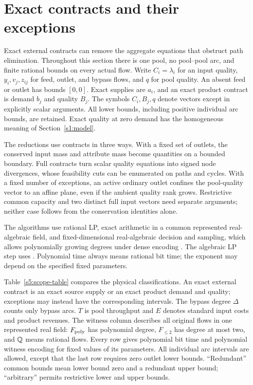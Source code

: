 \section{Exact contracts and their exceptions}\label{s5:contracts}

Exact external contracts can remove the aggregate equations that obstruct
path elimination. Throughout
this section there is one pool, no pool--pool arc, and finite rational
bounds on every actual flow. Write $C_i=\lambda_i$ for an input quality,
$y_i,v_j,z_{ij}$ for feed, outlet, and bypass flows, and $q$ for pool
quality. An absent feed or outlet has bounds $[0,0]$. Exact supplies are
$a_i$, and an exact product contract is demand $b_j$ and quality $B_j$.
The symbols $C_i,B_j,q$ denote vectors except in explicitly scalar
arguments. All lower bounds, including positive individual arc bounds,
are retained. Exact quality at zero demand has the homogeneous meaning
of Section~\ref{s1:model}.

The reductions use contracts in three ways. With a fixed set of outlets,
the conserved input mass and attribute mass become quantities on a
bounded boundary. Full contracts turn scalar quality equations into signed
node divergences, whose feasibility cuts can be enumerated on paths
and cycles. With a fixed number of exceptions, an active ordinary
outlet confines the pool-quality vector to an affine plane,
even if the ambient quality rank grows. Restrictive common capacity
and two distinct full input vectors need separate arguments;
neither case follows from the conservation identities alone.

The algorithms use rational LP, exact arithmetic in a common represented
real-algebraic field, and fixed-dimensional real-algebraic decision and
sampling, which allows polynomially growing degrees under dense
encoding \citep[Theorem~1.3.1 and Sections~3.1.3--3.2]
{basu1996-on-the-combinatorial-and-algebraic}. The algebraic LP step uses
\citet[Section~5, Remark~1]{s4:adler1994}. Polynomial time always
means rational bit time; the exponent may depend on the
specified fixed parameters.

Table~\ref{s5:scope-table} compares the physical classifications. An
exact external contract is an exact source supply or an
exact product demand and quality; exceptions may instead have the
corresponding intervals. The bypass degree $\Delta$ counts only bypass
arcs. $T$ is pool throughput and $E$ denotes standard input costs
and product revenues. The witness column describes all original flows
in one represented real field: $F_{\rm poly}$ has polynomial degree,
$F_{\le2}$ has degree at most two, and $\mathbb Q$ means rational flows.
Every row gives polynomial bit time and polynomial witness encoding
for fixed values of its parameters. All individual arc intervals are
allowed, except that the last row requires zero outlet lower bounds.
``Redundant'' common bounds mean lower bound zero and a redundant upper
bound; ``arbitrary'' permits restrictive lower and upper bounds.

